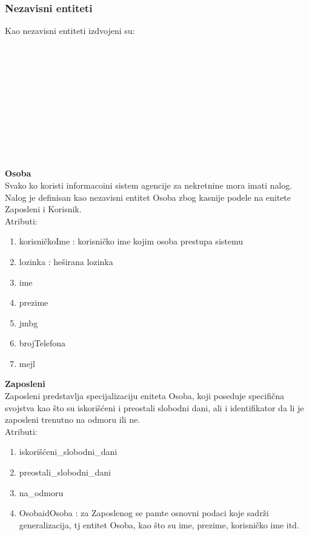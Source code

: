 \documentclass[20pt]{article}
\begin{document}
\newpage
\subsubsection{\bfseries \large Nezavisni entiteti}
Kao nezavisni entiteti izdvojeni su:\\
\\
\\
\\
\\
\\
\\
\\
\\
\\
\\
\\
{\bfseries Osoba}\\
Svako ko koristi informacoini sistem agencije za nekretnine mora imati nalog. Nalog je definisan kao nezavisni entitet Osoba zbog kasnije podele na enitete Zaposleni i Korisnik.\\
\indent Atributi:
\begin{enumerate}
        \item  korisni\v {c}koIme : korisni\v {c}ko ime kojim osoba prestupa sistemu
        \item  lozinka : he\v {s}irana lozinka
        \item  ime
        \item  prezime
        \item  jmbg
        \item  brojTelefona
        \item  mejl
\end{enumerate}
\newpage
{\bfseries Zaposleni}\\
Zaposleni predstavlja specijalizaciju eniteta Osoba, koji poseduje specifi\v {c}na svojstva kao \v {s}to su iskori\v {s}\' ceni i preostali slobodni dani, ali i identifikator da li je zaposleni trenutno na odmoru ili ne. \\
\indent Atributi:
\begin{enumerate}
        \item  iskori\v {s}\' ceni\_slobodni\_dani
        \item  preostali\_slobodni\_dani
        \item  na\_odmoru
        \item  OsobaidOsoba : za Zaposlenog se pamte osnovni podaci koje sadr\v {z}i generalizacija, tj entitet Osoba, kao \v {s}to su ime, prezime, korisni\v {c}ko ime itd.
\end{enumerate}
\end{document}
